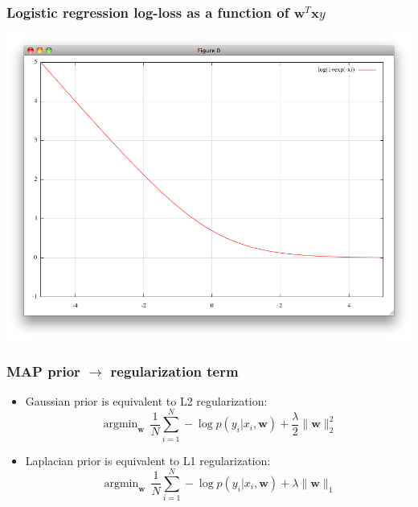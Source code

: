 \documentclass[ignorenonframetext,plain,fleqn]{beamer}
\DeclareMathOperator*{\argmin}{argmin}
\renewcommand{\vec}{\mathbf}
\begin{document}
\begin{frame}\frametitle{Logistic regression log-loss as a function of $\vec{w}^T\vec{x}y$}
\includegraphics[width=\textwidth]{images/log-loss.png}
\end{frame}

\begin{frame}\frametitle{MAP prior $\rightarrow$ regularization term}
\begin{itemize}
\item Gaussian prior is equivalent to L2 regularization: \[
  \argmin_\vec{w}\, \frac{1}{N} \sum_{i=1}^N -\log p(y_i|x_i,\vec{w}) + \frac{\lambda}{2}\|\vec{w}\|_2^2
\]
\item Laplacian prior is equivalent to L1 regularization: \[
  \argmin_\vec{w}\, \frac{1}{N} \sum_{i=1}^N -\log p(y_i|x_i,\vec{w}) + \lambda \|\vec{w}\|_1
\]
\end{itemize}
\end{frame}
\end{document}
